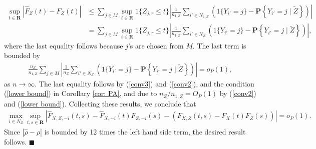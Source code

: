 \documentclass[12pt, fullpage]{amsart}
\theoremstyle{definition}
\theoremstyle{definition}
\theoremstyle{definition}
\begin{document}
\begin{bibunit}[econometrica]
\begin{align*}
	\sup_{t \in \mathbf{R}} \left|\hat F_{Z}(t) - F_Z(t) \right| &\le \sum_{j \in M}  \sup_{t \in \mathbf{R}} 1\{Z_{j,r} \le t\}\left|\frac{1}{n_{1,Z}}\sum_{i' \in N_{1,Z}}\left(1\{Y_{i'} = j\} - \mathbf{P}\left\{ Y_{i'} = j \mid \tilde Z  \right\}\right)\right|\\
	&= \sum_{j \in M}  \sup_{t \in \mathbf{R}} 1\{Z_{j,r} \le t\}\left|\frac{1}{n_{1,Z}}\sum_{i' \in N_Z}\left(1\{Y_{i'} = j\} - \mathbf{P}\left\{ Y_{i'} = j \mid \tilde Z  \right\}\right)\right|,
\end{align*}
where the last equality follows because $j$'s are chosen from $M$. The last term is bounded by
\begin{align*}
   \frac{n_Z}{n_{1,Z}} \sum_{j \in M}  \left|\frac{1}{n_Z}\sum_{i' \in N_Z}\left(1\{Y_{i'} = j\} - \mathbf{P}\left\{ Y_{i'} = j \mid \tilde Z  \right\}\right)\right| = o_P(1),
\end{align*}
as $n \rightarrow \infty$. The last equality follows by (\ref{conv3}) and (\ref{conv2}), and the condition (\ref{lower bound}) in Corollary \ref{cor: PA}, and due to $n_Z/n_{1,Z} = O_P(1)$ by (\ref{conv2}) and (\ref{lower bound}). Collecting these results, we conclude that
\begin{align*}
	\max_{i \in N_Z} \sup_{t,s \in \mathbf{R}} \left|\hat F_{X,Z,-i}(t,s) - \hat F_{X,-i}(t) \hat F_{Z,-i}(s) -\left(F_{X,Z}(t,s) - F_{X}(t) F_{Z}(s) \right) \right| = o_P(1).
\end{align*} 
Since $|\hat \rho - \rho|$ is bounded by 12 times the left hand side term, the desired result follows. $\blacksquare$\medskip


\end{bibunit}
\end{document}
